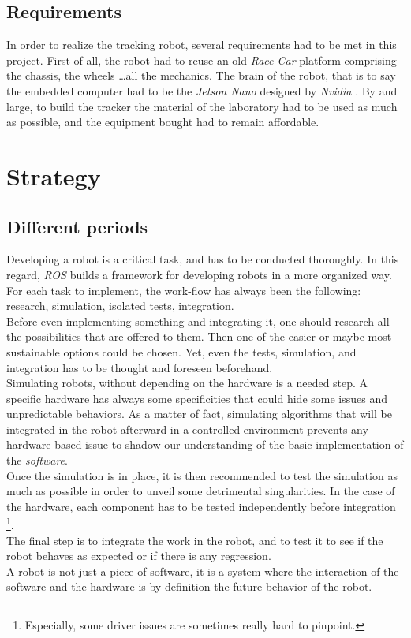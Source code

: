 		\subsection{Requirements}
		
		In order to realize the tracking robot, several requirements had to be met in this
		project. First of all, the robot had to reuse an old \textit{Race Car} platform comprising
		the chassis, the wheels \dots all the mechanics. The brain of the robot, that is to say
		the embedded computer had to be the \textit{Jetson Nano} designed by \textit{Nvidia} \cite{nano}. By and
		large, to build the tracker the material of the laboratory had to be used as much as 
		possible, and the equipment bought had to remain affordable.
	
	\section{Strategy}
	
		\subsection{Different periods}

		Developing a robot is a critical task, and has to be conducted thoroughly. 
		In this regard, \textit{ROS} builds a framework for developing 
		robots in a more organized way. For each task to implement, 
		the work-flow has always been the following: research, simulation, isolated 
		tests, integration.
		\\\indent Before even implementing something and integrating it, one should 
		research all the possibilities that are offered to them. Then one of the 
		easier or maybe most sustainable options could be chosen. Yet, even the
		tests, simulation, and integration has to be thought and foreseen beforehand.
		\\\indent Simulating robots, without depending on the hardware is
		a needed step.	 A specific hardware has always some specificities that
		could hide some issues and unpredictable behaviors. As a matter of fact, 
		simulating algorithms that will be integrated in the robot afterward in 
		a controlled environment prevents any hardware based issue to shadow
		our understanding of the basic implementation of
		the \textit{software}.
		\\\indent Once the simulation is in place, it is then 
		recommended to test the simulation as much as possible in order
		to unveil some detrimental singularities. In the case of the hardware, 
		each component has to be tested independently before integration
		\footnote{Especially, some driver issues are sometimes really 
		hard to pinpoint.}.
		\\\indent The final step is to integrate the work in the robot, and
		to test it to see if the robot behaves as expected or if there 
		is any regression.
		\\\indent A robot is not just a piece of software, it is a system 
		where the interaction of the software and the hardware is by 
		definition the future behavior of the robot.
		
